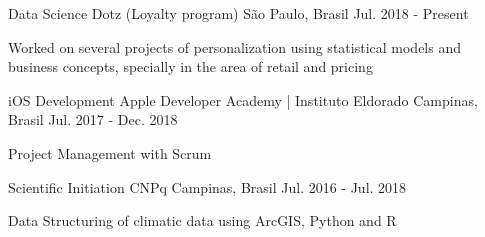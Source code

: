 \begin{cventries}
    \cventry
    {Data Science}
    {Dotz (Loyalty program)}
    {São Paulo, Brasil}
    {Jul. 2018 - Present}
    {
      \begin{cvitems}
        \item {Worked on several projects of personalization using statistical models and business concepts, specially in the \newline area of retail and pricing}
      \end{cvitems}
    }

    \cventry
    {iOS Development}
    {Apple Developer Academy | Instituto Eldorado}
    {Campinas, Brasil}
    {Jul. 2017 - Dec. 2018}
    {
      \begin{cvitems}
        \item {Project Management with Scrum}
      \end{cvitems}
    }

    \cventry
      {Scientific Initiation}
      {CNPq}
      {Campinas, Brasil}
      {Jul. 2016 - Jul. 2018}
      {
        \begin{cvitems}
          \item {Data Structuring of climatic data using ArcGIS, Python and R}
        \end{cvitems}
      }
\end{cventries}
